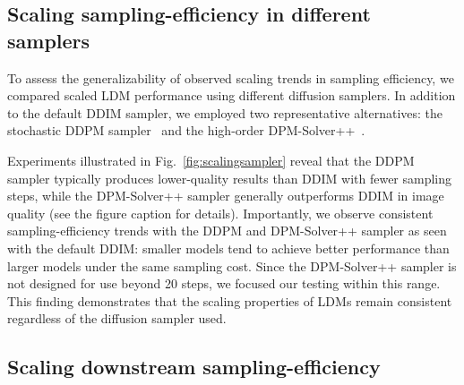 \subsection{Scaling sampling-efficiency in different samplers}
\label{sec:samplerscaling}

To assess the generalizability of observed scaling trends in sampling efficiency, we compared scaled LDM performance using different diffusion samplers. In addition to the default DDIM sampler, we employed two representative alternatives: the stochastic DDPM sampler~\cite{ho2020denoising} and the high-order DPM-Solver++~\cite{lu2022dpm2}.

Experiments illustrated in Fig.~\ref{fig:scalingsampler} reveal that the DDPM sampler typically produces lower-quality results than DDIM with fewer sampling steps, while the DPM-Solver++ sampler generally outperforms DDIM in image quality (see the figure caption for details).
%
Importantly, we observe consistent sampling-efficiency trends with the DDPM and DPM-Solver++ sampler as seen with the default DDIM: smaller models tend to achieve better performance than larger models under the same sampling cost. Since the DPM-Solver++ sampler is not designed for use beyond 20 steps, we focused our testing within this range.
%
This finding demonstrates that the scaling properties of LDMs remain consistent regardless of the diffusion sampler used.
%


\subsection{Scaling downstream sampling-efficiency}
\label{sec:scalingsamplingsr}


